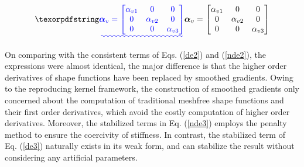\DIFaddbegin {}\begin{equation}
\DIFadd{\boldsymbol \alpha_v = \begin{bmatrix}
    \alpha_{v1} & 0 & 0 \\
    0 & \alpha_{v2} & 0 \\
    0 & 0 & \alpha_{v3} \\
\end{bmatrix}
}\end{equation}
\DIFaddend 

On comparing with the consistent terms of Eqs. (\ref{de2}) and (\ref{nde2}), the expressions were almost identical, the major difference is that the higher order derivatives of shape functions have been replaced by smoothed gradients. Owing to the reproducing kernel framework, the construction of smoothed gradients only concerned about the computation of traditional meshfree shape functions and their first order derivatives, which avoid the costly computation of higher order derivatives. Moreover, the stabilized terms in Eq. (\ref{nde3}) employs the penalty method \DIFaddbegin {}\DIFaddend to ensure the coercivity of stiffness\DIFaddbegin {}\DIFaddend . In contrast, the stabilized term of Eq. (\ref{de3}) naturally exists in its weak form, and can stabilize the result without considering any artificial parameters.

